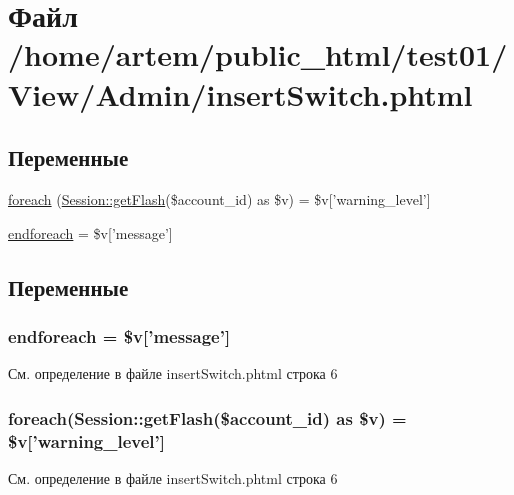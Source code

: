 \hypertarget{insert_switch_8phtml}{\section{Файл /home/artem/public\-\_\-html/test01/\-View/\-Admin/insert\-Switch.phtml}
\label{insert_switch_8phtml}
}
\subsection*{Переменные}
\begin{DoxyCompactItemize}
\item 
\hyperlink{insert_switch_8phtml_a1c191ff1be2612f80eabc75951f1841b}{foreach} (\hyperlink{class_session_ae4c4b98671bdd1fbfe4ae9defb5405ad}{Session\-::get\-Flash}(\$account\-\_\-id) as \$v) = \$v\mbox{[}'warning\-\_\-level'\mbox{]}
\item 
\hyperlink{insert_switch_8phtml_a672d9707ef91db026c210f98cc601123}{endforeach} = \$v\mbox{[}'message'\mbox{]}
\end{DoxyCompactItemize}


\subsection{Переменные}
\hypertarget{insert_switch_8phtml_a672d9707ef91db026c210f98cc601123}{
\subsubsection[{endforeach}]{\setlength{\rightskip}{0pt plus 5cm}endforeach = \$v\mbox{[}'message'\mbox{]}}}\label{insert_switch_8phtml_a672d9707ef91db026c210f98cc601123}


См. определение в файле insert\-Switch.\-phtml строка 6

\hypertarget{insert_switch_8phtml_a1c191ff1be2612f80eabc75951f1841b}{
\subsubsection[{foreach}]{\setlength{\rightskip}{0pt plus 5cm}foreach({\bf Session\-::get\-Flash}(\$account\-\_\-id) as \$v) = \$v\mbox{[}'warning\-\_\-level'\mbox{]}}}\label{insert_switch_8phtml_a1c191ff1be2612f80eabc75951f1841b}


См. определение в файле insert\-Switch.\-phtml строка 6

